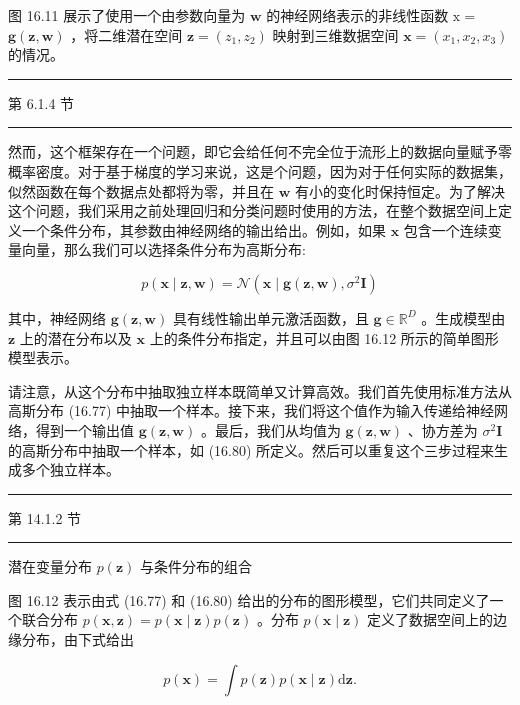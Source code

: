 \documentclass[10pt]{article}
\newcommand{\HRule}{\begin{center}\rule{0.9\linewidth}{0.2mm}\end{center}}
\begin{document}
图 16.11 展示了使用一个由参数向量为 \(\mathbf{w}\) 的神经网络表示的非线性函数 \(\mathrm{x} =\)  \(\mathbf{g}\left( {\mathbf{z},\mathbf{w}}\right)\) ，将二维潜在空间 \(\mathbf{z} = \left( {{z}_{1},{z}_{2}}\right)\) 映射到三维数据空间 \(\mathbf{x} = \left( {{x}_{1},{x}_{2},{x}_{3}}\right)\) 的情况。

\HRule

第 6.1.4 节

\HRule

然而，这个框架存在一个问题，即它会给任何不完全位于流形上的数据向量赋予零概率密度。对于基于梯度的学习来说，这是个问题，因为对于任何实际的数据集，似然函数在每个数据点处都将为零，并且在 \(\mathbf{w}\) 有小的变化时保持恒定。为了解决这个问题，我们采用之前处理回归和分类问题时使用的方法，在整个数据空间上定义一个条件分布，其参数由神经网络的输出给出。例如，如果 \(\mathbf{x}\) 包含一个连续变量向量，那么我们可以选择条件分布为高斯分布:

\[
p\left( {\mathbf{x} \mid  \mathbf{z},\mathbf{w}}\right)  = \mathcal{N}\left( {\mathbf{x} \mid  \mathbf{g}\left( {\mathbf{z},\mathbf{w}}\right) ,{\sigma }^{2}\mathbf{I}}\right)  \tag{16.80}
\]

其中，神经网络 \(\mathbf{g}\left( {\mathbf{z},\mathbf{w}}\right)\) 具有线性输出单元激活函数，且 \(\mathbf{g} \in  {\mathbb{R}}^{D}\) 。生成模型由 \(\mathbf{z}\) 上的潜在分布以及 \(\mathbf{x}\) 上的条件分布指定，并且可以由图 16.12 所示的简单图形模型表示。

请注意，从这个分布中抽取独立样本既简单又计算高效。我们首先使用标准方法从高斯分布 (16.77) 中抽取一个样本。接下来，我们将这个值作为输入传递给神经网络，得到一个输出值 \(\mathbf{g}\left( {\mathbf{z},\mathbf{w}}\right)\) 。最后，我们从均值为 \(\mathbf{g}\left( {\mathbf{z},\mathbf{w}}\right)\) 、协方差为 \({\sigma }^{2}\mathbf{I}\) 的高斯分布中抽取一个样本，如 (16.80) 所定义。然后可以重复这个三步过程来生成多个独立样本。

\HRule

第 14.1.2 节

\HRule

潜在变量分布 \(p\left( \mathbf{z}\right)\) 与条件分布的组合

图 16.12 表示由式 (16.77) 和 (16.80) 给出的分布的图形模型，它们共同定义了一个联合分布 \(p\left( {\mathbf{x},\mathbf{z}}\right)  = p\left( {\mathbf{x} \mid  \mathbf{z}}\right) p\left( \mathbf{z}\right)\) 。分布 \(p\left( {\mathbf{x} \mid  \mathbf{z}}\right)\) 定义了数据空间上的边缘分布，由下式给出

\[
p\left( \mathbf{x}\right)  = \int p\left( \mathbf{z}\right) p\left( {\mathbf{x} \mid  \mathbf{z}}\right) \mathrm{d}\mathbf{z}. \tag{16.81}
\]
\end{document}
